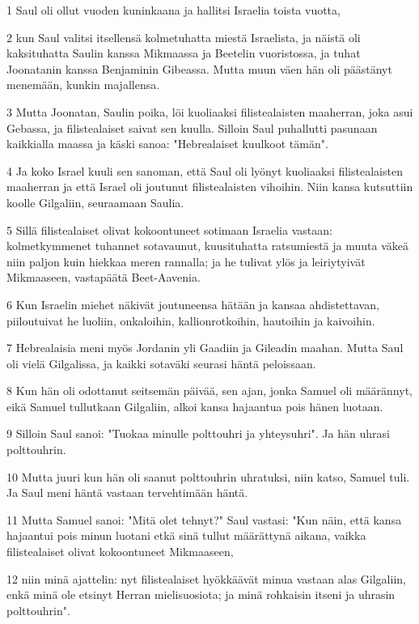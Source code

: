 \par 1 Saul oli ollut vuoden kuninkaana ja hallitsi Israelia toista vuotta,
\par 2 kun Saul valitsi itsellensä kolmetuhatta miestä Israelista, ja näistä oli kaksituhatta Saulin kanssa Mikmaassa ja Beetelin vuoristossa, ja tuhat Joonatanin kanssa Benjaminin Gibeassa. Mutta muun väen hän oli päästänyt menemään, kunkin majallensa.
\par 3 Mutta Joonatan, Saulin poika, löi kuoliaaksi filistealaisten maaherran, joka asui Gebassa, ja filistealaiset saivat sen kuulla. Silloin Saul puhallutti pasunaan kaikkialla maassa ja käski sanoa: "Hebrealaiset kuulkoot tämän".
\par 4 Ja koko Israel kuuli sen sanoman, että Saul oli lyönyt kuoliaaksi filistealaisten maaherran ja että Israel oli joutunut filistealaisten vihoihin. Niin kansa kutsuttiin koolle Gilgaliin, seuraamaan Saulia.
\par 5 Sillä filistealaiset olivat kokoontuneet sotimaan Israelia vastaan: kolmetkymmenet tuhannet sotavaunut, kuusituhatta ratsumiestä ja muuta väkeä niin paljon kuin hiekkaa meren rannalla; ja he tulivat ylös ja leiriytyivät Mikmaaseen, vastapäätä Beet-Aavenia.
\par 6 Kun Israelin miehet näkivät joutuneensa hätään ja kansaa ahdistettavan, piiloutuivat he luoliin, onkaloihin, kallionrotkoihin, hautoihin ja kaivoihin.
\par 7 Hebrealaisia meni myös Jordanin yli Gaadiin ja Gileadin maahan. Mutta Saul oli vielä Gilgalissa, ja kaikki sotaväki seurasi häntä peloissaan.
\par 8 Kun hän oli odottanut seitsemän päivää, sen ajan, jonka Samuel oli määrännyt, eikä Samuel tullutkaan Gilgaliin, alkoi kansa hajaantua pois hänen luotaan.
\par 9 Silloin Saul sanoi: "Tuokaa minulle polttouhri ja yhteysuhri". Ja hän uhrasi polttouhrin.
\par 10 Mutta juuri kun hän oli saanut polttouhrin uhratuksi, niin katso, Samuel tuli. Ja Saul meni häntä vastaan tervehtimään häntä.
\par 11 Mutta Samuel sanoi: "Mitä olet tehnyt?" Saul vastasi: "Kun näin, että kansa hajaantui pois minun luotani etkä sinä tullut määrättynä aikana, vaikka filistealaiset olivat kokoontuneet Mikmaaseen,
\par 12 niin minä ajattelin: nyt filistealaiset hyökkäävät minua vastaan alas Gilgaliin, enkä minä ole etsinyt Herran mielisuosiota; ja minä rohkaisin itseni ja uhrasin polttouhrin".
